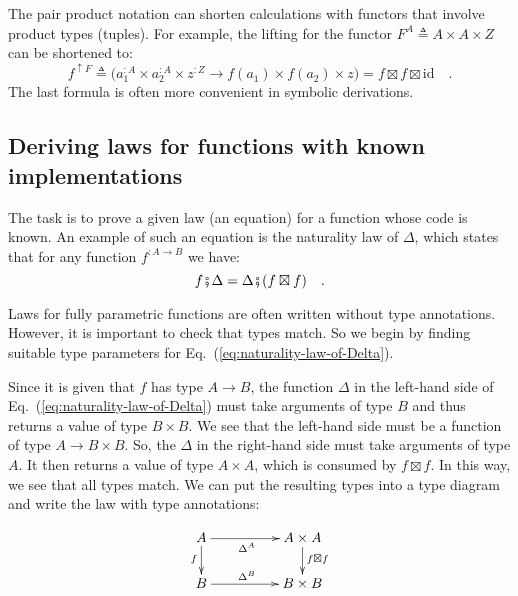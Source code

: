 The pair product notation can shorten calculations with functors that
involve product types (tuples). For example, the lifting for the functor
$F^{A}\triangleq A\times A\times Z$ can be shortened to:
\[
f^{\uparrow F}\triangleq\big(a_{1}^{:A}\times a_{2}^{:A}\times z^{:Z}\rightarrow f(a_{1})\times f(a_{2})\times z\big)=f\boxtimes f\boxtimes\text{id}\quad.
\]
The last formula is often more convenient in symbolic derivations. 

\subsection{Deriving laws for functions with known implementations\label{subsec:Deriving-laws-for-functions-}}

The task is to prove a given law (an equation) for a function whose
code is known. An example of such an equation is the naturality
law of $\Delta$, which states that for any function $f^{:A\rightarrow B}$
we have:
\begin{equation}
f\bef\Delta=\Delta\bef(f\boxtimes f)\quad.\label{eq:naturality-law-of-Delta}
\end{equation}

Laws for fully parametric functions are often written without type
annotations. However, it is important to check that types match. So
we begin by finding suitable type parameters for Eq.~(\ref{eq:naturality-law-of-Delta}).

Since it is given that $f$ has type $A\rightarrow B$, the function
$\Delta$ in the left-hand side of Eq.~(\ref{eq:naturality-law-of-Delta})
must take arguments of type $B$ and thus returns a value of type
$B\times B$. We see that the left-hand side must be a function of
type $A\rightarrow B\times B$. So, the $\Delta$ in the right-hand
side must take arguments of type $A$. It then returns a value of
type $A\times A$, which is consumed by $f\boxtimes f$. In this way,
we see that all types match. We can put the resulting types into a
type diagram and write the law with type annotations:

\begin{wrapfigure}{L}{0.25\columnwidth}%
\vspace{-2\baselineskip}
\[
\xymatrix{\xyScaleY{1.6pc}\xyScaleX{4.0pc}A\ar[d]\sb(0.45){f}\ar[r]\sb(0.45){\Delta^{A}} & A\times A\ar[d]\sp(0.45){f\boxtimes f}\\
B\ar[r]\sp(0.45){\Delta^{B}} & B\times B
}
\]
\vspace{-0.1\baselineskip}
\end{wrapfigure}%

